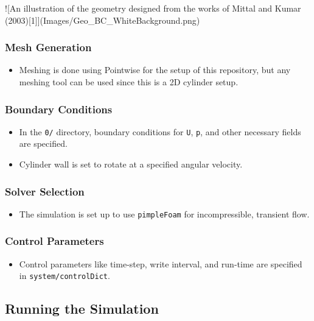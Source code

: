 ![An illustration of the geometry designed from the works of Mittal and Kumar (2003)[1]](Images/Geo\_BC\_WhiteBackground.png)



\subsubsection{Mesh Generation}

\begin{itemize}
\item Meshing is done using Pointwise for the setup of this repository, but any meshing tool can be used since this is a 2D cylinder setup. 
\end{itemize}

\subsubsection{Boundary Conditions}

\begin{itemize}
\item In the \texttt{0/} directory, boundary conditions for \texttt{U}, \texttt{p}, and other necessary fields are specified.
\item Cylinder wall is set to rotate at a specified angular velocity.
\end{itemize}

\subsubsection{Solver Selection}

\begin{itemize}
\item The simulation is set up to use \texttt{pimpleFoam} for incompressible, transient flow.
\end{itemize}

\subsubsection{Control Parameters}

\begin{itemize}
\item Control parameters like time-step, write interval, and run-time are specified in \texttt{system/controlDict}.
\end{itemize}

\subsection{Running the Simulation}

